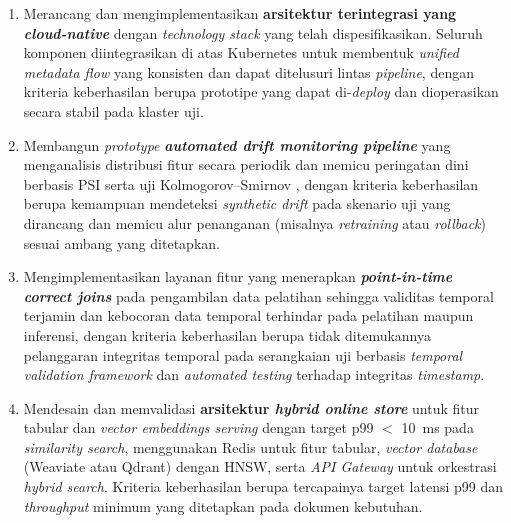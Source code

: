 \vspace{0.5em}
\begin{enumerate}
    \item Merancang dan mengimplementasikan \textbf{arsitektur terintegrasi yang \textit{cloud-native}} dengan \textit{technology stack} yang telah dispesifikasikan. Seluruh komponen diintegrasikan di atas Kubernetes \autocite{lakka2025kubernetes} untuk membentuk \textit{unified metadata flow} yang konsisten dan dapat ditelusuri lintas \textit{pipeline}, dengan kriteria keberhasilan berupa prototipe yang dapat di-\textit{deploy} dan dioperasikan secara stabil pada klaster uji.
    
    \vspace{0.5em}

    \item Membangun \textit{prototype} \textbf{\textit{automated drift monitoring pipeline}} yang menganalisis distribusi fitur secara periodik dan memicu peringatan dini berbasis PSI serta uji Kolmogorov--Smirnov \autocite{cespedes2024efficient}, dengan kriteria keberhasilan berupa kemampuan mendeteksi \textit{synthetic drift} pada skenario uji yang dirancang dan memicu alur penanganan (misalnya \textit{retraining} atau \textit{rollback}) sesuai ambang yang ditetapkan.
    
    \vspace{0.5em}

    \item Mengimplementasikan layanan fitur yang menerapkan \textbf{\textit{point-in-time correct joins}} pada pengambilan data pelatihan sehingga validitas temporal terjamin dan kebocoran data temporal terhindar pada pelatihan maupun inferensi, dengan kriteria keberhasilan berupa tidak ditemukannya pelanggaran integritas temporal pada serangkaian uji berbasis \textit{temporal validation framework} dan \textit{automated testing} terhadap integritas \textit{timestamp}.
    
    \vspace{0.5em}

    \item Mendesain dan memvalidasi \textbf{arsitektur \textit{hybrid online store}} untuk fitur tabular dan \textit{vector embeddings serving} dengan target p99 $<$ 10~ms pada \textit{similarity search}, menggunakan Redis untuk fitur tabular, \textit{vector database} (Weaviate atau Qdrant) dengan HNSW, serta \textit{API Gateway} untuk orkestrasi \textit{hybrid search}. Kriteria keberhasilan berupa tercapainya target latensi p99 dan \textit{throughput} minimum yang ditetapkan pada dokumen kebutuhan.
    

\end{enumerate}
